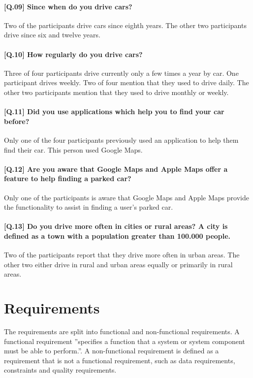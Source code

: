 \paragraph{[Q.09] Since when do you drive cars?}
Two of the participants drive cars since eighth years. The other two participants drive since six and twelve years.

\paragraph{[Q.10] How regularly do you drive cars?}
Three of four participants drive currently only a few times a year by car. One participant drives weekly. Two of four mention that they used to drive daily. The other two participants mention that they used to drive monthly or weekly. 

\paragraph{[Q.11] Did you use applications which help you to find your car before?}
Only one of the four participants previously used an application to help them find their car. This person used Google Maps.

\paragraph{[Q.12] Are you aware that Google Maps and Apple Maps offer a feature to help finding a parked car?}
Only one of the participants is aware that Google Maps and Apple Maps provide the functionality to assist in finding a user's parked car. 

\paragraph{[Q.13] Do you drive more often in cities or rural areas? A city is defined as a town with a population greater than 100.000 people.}
Two of the participants report that they drive more often in urban areas. The other two either drive in rural and urban areas equally or primarily in rural areas.


\section{Requirements}
The requirements are split into functional and non-functional requirements. A functional requirement ''specifies a function that a system or system component must be able to perform.''. A non-functional requirement is defined as a requirement that is not a functional requirement, such as data requirements, constraints and quality requirements. \cite{eide2005quantification}


